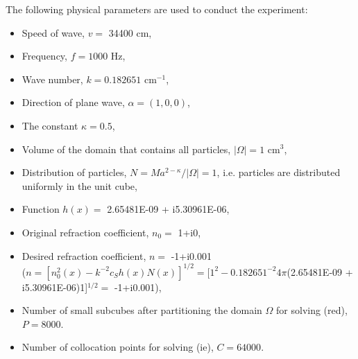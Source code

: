 \documentclass[12pt]{elsarticle}
\numberwithin{equation}{section}
\begin{document}
The following physical parameters are used to conduct the experiment:
\begin{itemize}
	\item Speed of wave, $v=$ 34400 cm,
	\item Frequency, $f= 1000$ Hz,
	\item Wave number, $k= 0.182651$ cm$^{-1}$,
	\item Direction of plane wave, $\alpha= (1, 0, 0)$,
	\item The constant $\kappa= 0.5$,
	\item Volume of the domain that contains all particles, $|\Omega|= 1$ cm$^3$,
	\item Distribution of particles, $N=Ma^{2-\kappa}/|\Omega|= 1$, i.e. particles are distributed uniformly in the unit cube,
	\item Function $h(x) =$ 2.65481E-09 + i5.30961E-06,
	\item Original refraction coefficient, $n_0=$ 1+i0,
	\item Desired refraction coefficient, $n =$ -1+i0.001\\
	($n=[n_0^2(x)-k^{-2}c_Sh(x)N(x)]^{1/2} = [1^2-0.182651^{-2}4\pi$(2.65481E-09 + i5.30961E-06)1]$^{1/2} =$ -1+i0.001),
	\item Number of small subcubes after partitioning the domain $\Omega$ for solving (red), $P=8000$.
	\item Number of collocation points for solving (ie), $C= 64000$.
\end{itemize}
\end{document}
